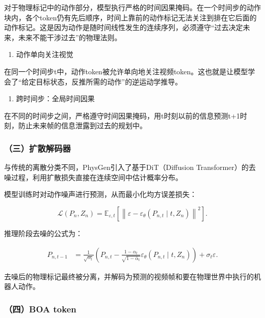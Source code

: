 对于物理标记中的动作部分，模型执行严格的时间因果掩码。在一个时间步的动作块内，各个token仍有先后顺序，时间上靠前的动作标记无法关注到排在它后面的动作标记。这是因为动作是随时间线性发生的连续序列，必须遵守``过去决定未来，未来不能干涉过去''的物理法则。

\begin{enumerate}
\def\labelenumi{\arabic{enumi}.}
\setcounter{enumi}{2}
\tightlist
\item
  动作单向关注视觉
\end{enumerate}

在同一个时间步t中，动作token被允许单向地关注视频token。这也就是让模型学会了``给定目标状态，反推所需的动作''的逆运动学推导。

\begin{enumerate}
\def\labelenumi{\arabic{enumi}.}
\setcounter{enumi}{3}
\tightlist
\item
  跨时间步：全局时间因果
\end{enumerate}

在不同的时间步之间，严格遵守时间因果掩码，用t时刻以前的信息预测t+1时刻，防止未来帧的信息泄露到过去的规划中。

\hypertarget{ux4e09ux6269ux6563ux89e3ux7801ux5668}{%
\subsubsection{（三）扩散解码器}\label{ux4e09ux6269ux6563ux89e3ux7801ux5668}}

与传统的离散分类不同，PhysGen引入了基于DiT（Diffusion Transformer）的去噪过程，利用扩散损失直接在连续空间中估计概率分布。

模型训练时对动作噪声进行预测，从而最小化均方误差损失：

\[
\mathcal{L}(P_n,Z_n)=\mathbb{E}_{\varepsilon,t}\left[\left\|\varepsilon-\varepsilon_\theta(P_{n,t}\mid t,Z_n)\right\|^2\right].
\]

推理阶段去噪的公式为：

\[
\begin{aligned}
P_{n,t-1}
&=\frac{1}{\sqrt{\alpha_t}}
\left(
P_{n,t}-\frac{1-\alpha_t}{\sqrt{1-\bar{\alpha}_t}}
\varepsilon_\theta(P_{n,t}\mid t,Z_n)
\right)
+\sigma_t\varepsilon.
\end{aligned}
\]

去噪后的物理标记最终被分离，并解码为预测的视频帧和要在物理世界中执行的机器人动作。

\hypertarget{ux56dbboa-token}{%
\subsubsection{（四）BOA token}\label{ux56dbboa-token}}


